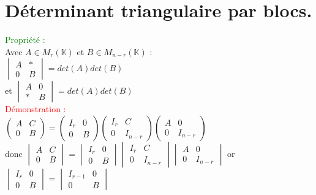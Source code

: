 \documentclass{article}
\begin{document}
\section{Déterminant triangulaire par blocs.}
\textcolor{green}{Propriété :} \\
  Avec $A \in M_{r} (\mathbb K)$ et $B \in M_{n-r}(\mathbb K)$ : \\
  $\begin{vmatrix} A & \ast \\ 0 & B \end{vmatrix}=det(A) det(B)$ \\
  et $\begin{vmatrix} A & 0 \\ \ast & B \end{vmatrix}=det(A) det(B)$ \\
  \textcolor{red}{Démonstration :} \\
  $\begin{pmatrix} A & C \\ 0 & B \end{pmatrix}= \begin{pmatrix} I_r & 0 \\ 0 & B \end{pmatrix} \begin{pmatrix} I_r & C \\ 0 & I_{n-r} \end{pmatrix}\begin{pmatrix} A & 0 \\ 0 & I_{n-r} \end{pmatrix} $ \\
  donc $\begin{vmatrix} A & C \\ 0 & B \end{vmatrix}= \begin{vmatrix} I_r & 0 \\ 0 & B \end{vmatrix} \begin{vmatrix} I_r & C \\ 0 & I_{n-r} \end{vmatrix}\begin{vmatrix} A & 0 \\ 0 & I_{n-r} \end{vmatrix} $
  or $\begin{vmatrix} I_r & 0 \\ 0 & B \end{vmatrix}= \begin{vmatrix} I_{r-1} & 0 \\ 0  & B\end{vmatrix}$\\
\end{document}
